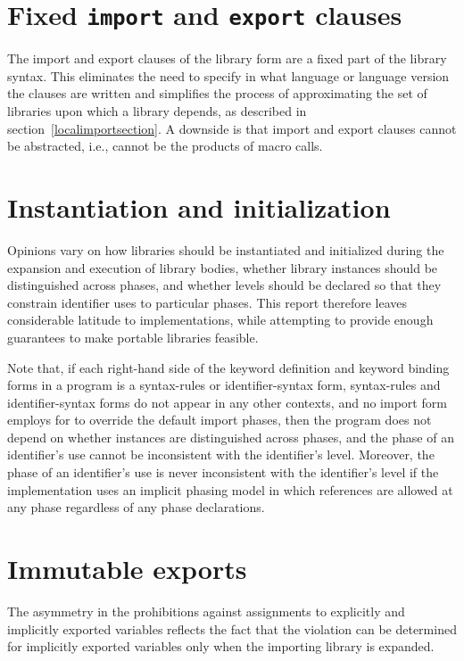 \documentclass[twoside,twocolumn]{algol60}
\begin{document}
\section{Fixed {\tt import} and {\tt export} clauses}

The {\cf import} and {\cf export} clauses of the {\cf library} form
are a fixed part of the library syntax.
This eliminates the need to specify in what language or language
version the clauses are written and simplifies the process of
approximating the set of libraries upon which a library depends, as
described in section~\ref{localimportsection}.
A downside is that {\cf import} and {\cf export} clauses cannot
be abstracted, i.e., cannot be the products of macro calls.

\section{Instantiation and initialization}

Opinions vary on how libraries should be instantiated and
initialized during the expansion and execution of library bodies,
whether library instances should be distinguished across phases,
and whether levels should be declared so that they constrain 
identifier uses to particular phases. This report therefore leaves
considerable latitude to implementations, while attempting to
provide enough guarantees to make portable libraries feasible.

Note that, if each right-hand side of the keyword definition and keyword
binding forms in a program is a {\cf syntax-rules} or
{\cf identifier-syntax} form, {\cf syntax-rules} and {\cf identifier-syntax}
forms do not appear in any other contexts, and no {\cf import} form employs
{\cf for} to override the default import phases, 
then the program does not depend on whether instances are
distinguished across phases, and the phase of an identifier's use cannot
be inconsistent with the identifier's level.
Moreover, the phase of an identifier's use is never inconsistent with the
identifier's level if the implementation uses an implicit phasing model in
which references are allowed at any phase regardless of any phase
declarations.

\section{Immutable exports}

The asymmetry in the prohibitions against assignments to explicitly
and implicitly exported variables reflects the fact that the violation
can be determined for implicitly exported variables only when the
importing library is expanded.
\end{document}
